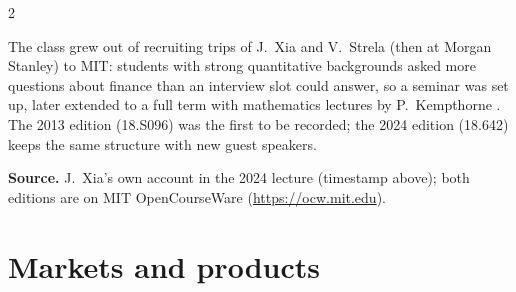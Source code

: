 \begin{paracol}{2}
\begin{history}
The class grew out of recruiting trips of J.~Xia and V.~Strela (then at Morgan Stanley) to MIT:
students with strong quantitative backgrounds asked more questions about finance than an
interview slot could answer, so a seminar was set up, later extended to a full term with
mathematics lectures by P.~Kempthorne . The 2013 edition (18.S096) was the
first to be recorded; the 2024 edition (18.642) keeps the same structure with new guest speakers.

\smallskip
{\footnotesize\textbf{Source.} J.~Xia's own account in the 2024 lecture (timestamp above); both
editions are on MIT OpenCourseWare (\url{https://ocw.mit.edu}).}
\end{history}

\section{Markets and products}\label{sec:products}


\end{paracol}
